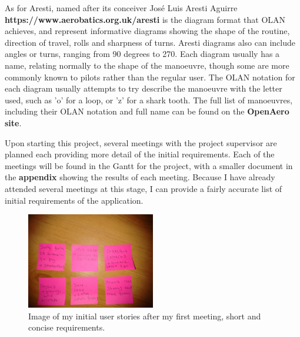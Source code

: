 As for Aresti, named after its conceiver José Luis Aresti Aguirre \textbf{https://www.aerobatics.org.uk/aresti} is the diagram format that OLAN achieves, and represent informative diagrams showing the shape of the routine, direction of travel, rolls and sharpness of turns. Aresti diagrams also can include angles or turns, ranging from 90 degrees to 270. Each diagram usually has a name, relating normally to the shape of the manoeuvre, though some are more commonly known to pilots rather than the regular user. The OLAN notation for each diagram usually attempts to try describe the manoeuvre with the letter used, such as 'o' for a loop, or 'z' for a shark tooth. The full list of manoeuvres, including their OLAN notation and full name can be found on the \textbf{OpenAero site}.

Upon starting this project, several meetings with the project supervisor are planned each providing more detail of the initial requirements. Each of the meetings will be found in the Gantt for the project, with a smaller document in the\textbf{ appendix} showing the results of each meeting. Because I have already attended several meetings at this stage, I can provide a fairly accurate list of initial requirements of the application.\\

\begin{figure}[h!]
  \centering
      \includegraphics[width=0.5\textwidth]{images/notes.jpg}
  \caption{Image of my initial user stories after my first meeting, short and concise requirements.}
\end{figure}

